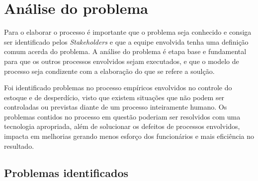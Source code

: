 \chapter{Análise do problema}

Para o elaborar o processo é importante que o problema seja conhecido e consiga ser identificado pelos {\itshape Stakeholders} e que a equipe envolvida tenha uma definição comum acerda do problema. A análise do problema é etapa base e fundamental para que os outros processos envolvidos sejam executados, e que o modelo de processo seja condizente com a elaboração do que se refere a soulção.

Foi identificado problemas no processo empíricos envolvidos no controle do estoque e de desperdício, visto que existem situações que não podem ser controladas ou previstas diante de um processo inteiramente humano. Os problemas contidos no processo em questão poderiam ser resolvidos com uma tecnologia apropriada, além de solucionar os defeitos de processos envolvidos, impacta em melhorias gerando menos esforço dos funcionários e mais eficiência no resultado.

\section{Problemas identificados}
